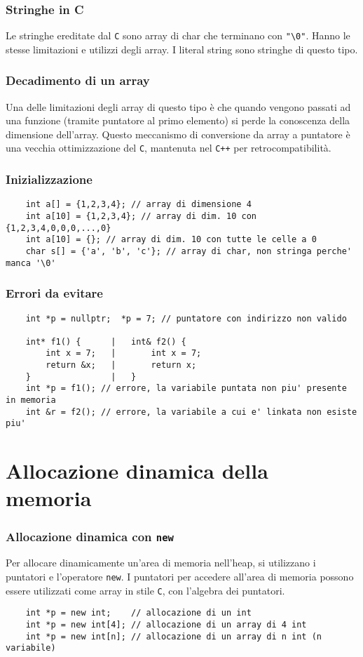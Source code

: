 \documentclass[a4paper]{article}
\begin{document}
\subsubsection*{Stringhe in C}
Le stringhe ereditate dal \verb|C| sono array di char che terminano con \verb|"\0"|. Hanno le stesse limitazioni e utilizzi
degli array. I literal string sono stringhe di questo tipo.

\subsubsection*{Decadimento di un array}
Una delle limitazioni degli array di questo tipo è che quando vengono passati ad una funzione (tramite puntatore al primo
elemento) si perde la conoscenza della dimensione dell'array. Questo meccanismo di conversione da array a puntatore è una
vecchia ottimizzazione del \verb|C|, mantenuta nel \verb|C++| per retrocompatibilità.

\subsubsection*{Inizializzazione}
\begin{lstlisting}
	int a[] = {1,2,3,4}; // array di dimensione 4
	int a[10] = {1,2,3,4}; // array di dim. 10 con {1,2,3,4,0,0,0,...,0}
	int a[10] = {}; // array di dim. 10 con tutte le celle a 0
	char s[] = {'a', 'b', 'c'}; // array di char, non stringa perche' manca '\0'
\end{lstlisting}

\subsubsection*{Errori da evitare}
\begin{lstlisting}
	int *p = nullptr;  *p = 7; // puntatore con indirizzo non valido

	int* f1() {      |   int& f2() {
		int x = 7;   |       int x = 7;
		return &x;   |       return x;
	}                |   }
	int *p = f1(); // errore, la variabile puntata non piu' presente in memoria
	int &r = f2(); // errore, la variabile a cui e' linkata non esiste piu'
\end{lstlisting}

\newpage

\section{Allocazione dinamica della memoria}
\subsubsection*{Allocazione dinamica con \texttt{new}}
Per allocare dinamicamente un'area di memoria nell'heap, si utilizzano i puntatori e l'operatore \verb|new|. I puntatori per
accedere all'area di memoria possono essere utilizzati come array in stile \verb|C|, con l'algebra dei puntatori.
\begin{lstlisting}
	int *p = new int;    // allocazione di un int
	int *p = new int[4]; // allocazione di un array di 4 int
	int *p = new int[n]; // allocazione di un array di n int (n variabile)
\end{lstlisting}
\end{document}
